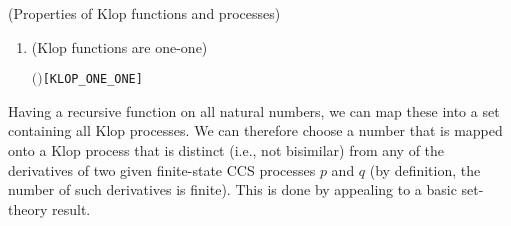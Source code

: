\begin{proposition}{(Properties of Klop functions and processes)}
\begin{enumerate}
\begin{alltt}
\HOLTokenTurnstile{}  \HOLSymConst{\HOLTokenLt{}}  \HOLSymConst{\HOLTokenImp{}} \HOLSymConst{\HOLTokenNeg{}}\ensuremath{(}   \HOLSymConst{\HOLTokenWeakEQ}   \ensuremath{)}\hfill{[KLOP_PROP2']}
\end{alltt}
\item (Klop functions are one-one)
\begin{alltt}
\HOLTokenTurnstile{}  \ensuremath{(} \ensuremath{)}\hfill{[KLOP_ONE_ONE]}
\end{alltt}
\end{enumerate}
\end{proposition}
Having
 a recursive function  on all natural numbers,
  we can map these into a set containing  all Klop processes. 
We can therefore 
choose a number that is mapped onto a Klop process
that is distinct (i.e., not bisimilar)  from 
any  of the derivatives of two  given 
 finite-state CCS processes $p$ and $q$
(by definition, the number of such derivatives is finite).
This is done by 
appealing to a basic set-theory result.

